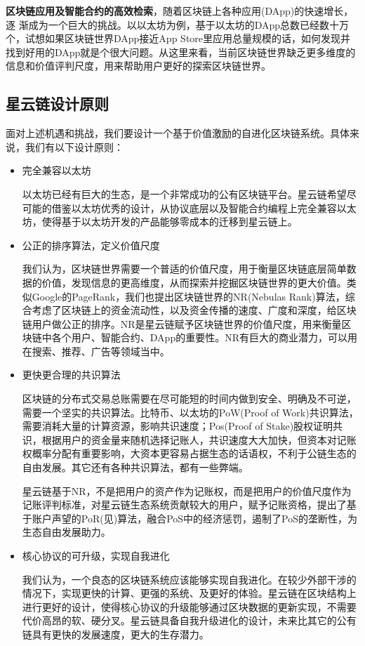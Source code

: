 \textbf{区块链应用及智能合约的高效检索}，随着区块链上各种应用(DApp)的快速增长，逐 渐成为一个巨大的挑战。以以太坊为例，基于以太坊的DApp总数已经数十万个，试想如果区块链世界DApp接近App Store里应用总量规模的话，如何发现并找到好用的DApp就是个很大问题。从这里来看，当前区块链世界缺乏更多维度的信息和价值评判尺度，用来帮助用户更好的探索区块链世界。

\subsection{星云链设计原则}
面对上述机遇和挑战，我们要设计一个基于价值激励的自进化区块链系统。具体来说，我们有以下设计原则：
\begin{itemize}
	\item 完全兼容以太坊

	以太坊已经有巨大的生态，是一个非常成功的公有区块链平台。星云链希望尽可能的借鉴以太坊优秀的设计，从协议底层以及智能合约编程上完全兼容以太坊，使得基于以太坊开发的产品能够零成本的迁移到星云链上。
	\item 公正的排序算法，定义价值尺度

	我们认为，区块链世界需要一个普适的价值尺度，用于衡量区块链底层简单数据的价值，发现信息的更高维度，从而探索并挖掘区块链世界的更大价值。类似Google的PageRank\cite{Brin2010}\cite{page1999pagerank}，我们也提出区块链世界的NR(Nebulas Rank)算法，综合考虑了区块链上的资金流动性，以及资金传播的速度、广度和深度，给区块链用户做公正的排序。NR是星云链赋予区块链世界的价值尺度，用来衡量区块链中各个用户、智能合约、DApp的重要性。NR有巨大的商业潜力，可以用在搜索、推荐、广告等领域当中。
	\item 更快更合理的共识算法

区块链的分布式交易总账需要在尽可能短的时间内做到安全、明确及不可逆，需要一个坚实的共识算法。比特币、以太坊的PoW(Proof of Work)共识算法，需要消耗大量的计算资源，影响共识速度；Pos(Proof of Stake)股权证明共识，根据用户的资金量来随机选择记账人，共识速度大大加快，但资本对记账权概率分配有重要影响，大资本更容易占据生态的话语权，不利于公链生态的自由发展。其它还有各种共识算法，都有一些弊端。

星云链基于NR，不是把用户的资产作为记账权，而是把用户的价值尺度作为记账评判标准，对星云链生态系统贡献较大的用户，赋予记账资格，提出了基于账户声望的PoR(见)算法，融合PoS中的经济惩罚，遏制了PoS的垄断性，为生态自由发展助力。

	\item 核心协议的可升级，实现自我进化

我们认为，一个良态的区块链系统应该能够实现自我进化。在较少外部干涉的情况下，实现更快的计算、更强的系统、及更好的体验。星云链在区块结构上进行更好的设计，使得核心协议的升级能够通过区块数据的更新实现，不需要代价高昂的软、硬分叉。星云链具备自我升级进化的设计，未来比其它的公有链具有更快的发展速度，更大的生存潜力。


\end{itemize}
